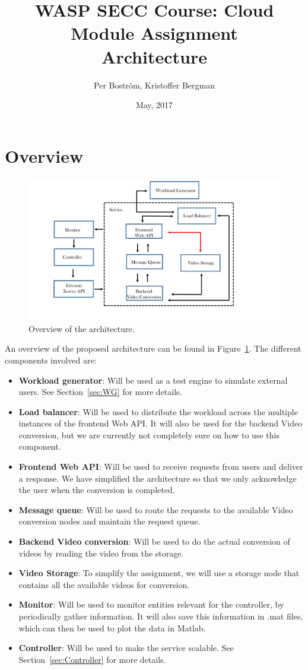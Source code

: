 \documentclass[a4paper, 10pt, english]{article}
\title{WASP SECC Course: Cloud Module Assignment\\Architecture}
\author{Per Boström, Kristoffer Bergman}
\date{May, 2017}
\begin{document}
\maketitle

\section{Overview}

\begin{figure}
	\label{fig:architecture}
	\centering
	\includegraphics[width=1\textwidth]{figs/workflow.pdf}
	\caption{Overview of the architecture.}
\end{figure}
An overview of the proposed architecture can be found in Figure~\ref{fig:architecture}. The different components involved are:
\begin{itemize}
	\item \textbf{Workload generator}: Will be used as a test engine to simulate external users. See Section~\ref{sec:WG} for more details.
	\item \textbf{Load balancer}: Will be used to distribute the workload across the multiple instances of the frontend Web API. It will also be used for the backend Video conversion, but we are currently not completely sure on how to use this component. 
	\item \textbf{Frontend Web API}: Will be used to receive requests from users and deliver a response. We have simplified the architecture so that we only acknowledge the user when the conversion is completed.  
	\item \textbf{Message queue}: Will be used to route the requests to the available Video conversion nodes and maintain the request queue. 
	\item \textbf{Backend Video conversion}: Will be used to do the actual conversion of videos by reading the video from the storage.
	\item \textbf{Video Storage}: To simplify the assignment, we will use a storage node that contains all the available videos for conversion.  
	\item \textbf{Monitor}: Will be used to monitor entities relevant for the controller, by periodically gather information. It will also save this information in .mat files, which can then be used to plot the data in Matlab. 
	\item \textbf{Controller}: Will be used to make the service scalable. See Section~\ref{sec:Controller} for more details.
	
\end{itemize}
\end{document}
